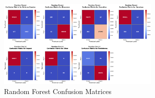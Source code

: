         \begin{figure}[H]
        
            \centering
            
            \begin{minipage}{\textwidth}
                \centering
                \begin{minipage}[c]{\textwidth}
                    \centering
                    \includegraphics[width=0.7\textwidth]{../figures/plots/section2/Random_Forest_confusion_matrices.png}
                    \caption{Random Forest Confusion Matrices}
                    \label{fig:}
                \end{minipage}%
            \end{minipage}

            \vspace{0.5cm}  %
            

\end{figure}
